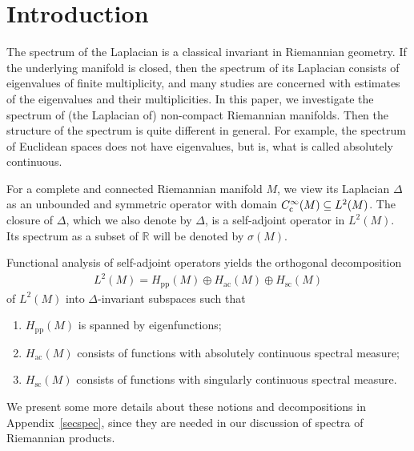 \documentclass[pdftex]{sigma}
\numberwithin{equation}{section}
\def\p{\mathrm{pp}}
\def\ac{\mathrm{ac}}
\def\sc{\mathrm{sc}}
\def\R{\mathbb R}
\begin{document}
\renewcommand{\thefootnote}{\arabic{footnote}}
\setcounter{footnote}{0}

\section{Introduction}

The spectrum of the Laplacian is a classical invariant in Riemannian geometry.
If the underlying manifold is closed,
then the spectrum of its Laplacian consists of eigenvalues of finite multiplicity,
and many studies are concerned with estimates of the eigenvalues and their multiplicities.
In this paper, we investigate the spectrum of (the Laplacian of) non-compact Riemannian manifolds.
Then the structure of the spectrum is quite different in general.
For example, the spectrum of Euclidean spaces does not have eigenvalues,
but is, what is called absolutely continuous.

For a complete and connected Riemannian manifold $M$, we view its Laplacian $\Delta$
as an unbounded and symmetric operator with domain $C^\infty_{\rm c}(M) \subseteq L^2(M)$.
The closure of $\Delta$, which we also denote by $\Delta$, is a self-adjoint operator in $L^2(M)$.
Its spectrum as a subset of $\R$ will be denoted by $\sigma(M)$.

Functional analysis of self-adjoint operators yields the orthogonal decomposition
\begin{align*}%
L^2(M) = H_{\p}(M) \oplus H_{\ac}(M) \oplus H_{\sc}(M)
\end{align*}
of $L^2(M)$ into $\Delta$-invariant subspaces such that
\begin{enumerate}\itemsep=0pt
\item[(1)] $H_{\p}(M)$ is spanned by eigenfunctions;
\item[(2)] $H_{\ac}(M)$ consists of functions with absolutely continuous spectral measure;
\item[(3)] $H_{\sc}(M)$ consists of functions with singularly continuous spectral measure.
\end{enumerate}
We present some more details about these notions and decompositions in Appendix~\ref{secspec},
since they are needed in our discussion of spectra of Riemannian products.
\end{document}
